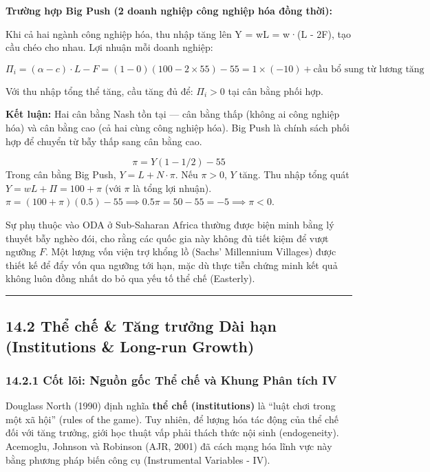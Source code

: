 \documentclass[
]{article}
\begin{document}
\textbf{Trường hợp Big Push (2 doanh nghiệp công nghiệp hóa đồng thời):}

Khi cả hai ngành công nghiệp hóa, thu nhập tăng lên Y = wL = w·(L - 2F),
tạo cầu chéo cho nhau. Lợi nhuận mỗi doanh nghiệp:

\[\Pi_i = (\alpha - c) \cdot L - F = (1 - 0)(100 - 2 \times 55) - 55 = 1 \times (-10) + \text{cầu bổ sung từ lương tăng}\]

Với thu nhập tổng thể tăng, cầu tăng đủ để: \(\Pi_i > 0\) tại cân bằng
phối hợp.

\textbf{Kết luận:} Hai cân bằng Nash tồn tại --- cân bằng thấp (không ai
công nghiệp hóa) và cân bằng cao (cả hai cùng công nghiệp hóa). Big Push
là chính sách phối hợp để chuyển từ bẫy thấp sang cân bằng cao.

\[ \pi = Y(1 - 1/2) - 55 \] Trong cân bằng Big Push,
\(Y = L + N \cdot \pi\). Nếu \(\pi > 0\), \(Y\) tăng. Thu nhập tổng quát
\(Y = wL + \Pi = 100 + \pi\) (với \(\pi\) là tổng lợi nhuận).
\(\pi = (100 + \pi)(0.5) - 55 \implies 0.5\pi = 50 - 55 = -5 \implies \pi < 0\).

Sự phụ thuộc vào ODA ở Sub-Saharan Africa thường được biện minh bằng lý
thuyết bẫy nghèo đói, cho rằng các quốc gia này không đủ tiết kiệm để
vượt ngưỡng \(F\). Một lượng vốn viện trợ khổng lồ (Sachs' Millennium
Villages) được thiết kế để đẩy vốn qua ngưỡng tới hạn, mặc dù thực tiễn
chứng minh kết quả không luôn đồng nhất do bỏ qua yếu tố thể chế
(Easterly).

\begin{center}\rule{0.5\linewidth}{0.5pt}\end{center}

\subsection{14.2 Thể chế \& Tăng trưởng Dài hạn (Institutions \&
Long-run
Growth)}\label{thux1ec3-chux1ebf-tux103ng-trux1b0ux1edfng-duxe0i-hux1ea1n-institutions-long-run-growth}

\subsubsection{14.2.1 Cốt lõi: Nguồn gốc Thể chế và Khung Phân tích
IV}\label{cux1ed1t-luxf5i-nguux1ed3n-gux1ed1c-thux1ec3-chux1ebf-vuxe0-khung-phuxe2n-tuxedch-iv}

Douglass North (1990) định nghĩa \textbf{thể chế (institutions)} là
``luật chơi trong một xã hội'' (rules of the game). Tuy nhiên, để lượng
hóa tác động của thể chế đối với tăng trưởng, giới học thuật vấp phải
thách thức nội sinh (endogeneity). Acemoglu, Johnson và Robinson (AJR,
2001) đã cách mạng hóa lĩnh vực này bằng phương pháp biến công cụ
(Instrumental Variables - IV).
\end{document}
